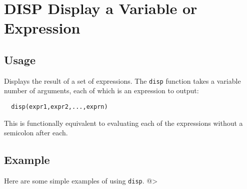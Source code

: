 \section{DISP Display a Variable or Expression}

\subsection{Usage}

Displays the result of a set of expressions.  The \verb|disp| function
takes a variable number of arguments, each of which is an expression
to output:
\begin{verbatim}
  disp(expr1,expr2,...,exprn)
\end{verbatim}
This is functionally equivalent to evaluating each of the expressions
without a semicolon after each.
\subsection{Example}

Here are some simple examples of using \verb|disp|.
@>

